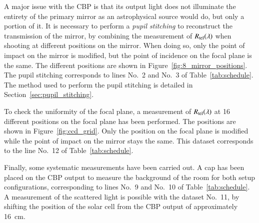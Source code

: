A major issue with the CBP is that its output light does not illuminate the entirety of the \SD primary mirror as an astrophysical source would do, but only a portion of it. It is necessary to perform a \textit{pupil stitching} to reconstruct the transmission of the mirror, by combining the measurement of $R_{\mathrm{tel}}(\lambda)$ when shooting at different positions on the mirror. When doing so, only the point of impact on the mirror is modified, but the point of incidence on the focal plane is the same. The different positions are shown in Figure~\ref{fig:8_mirror_positions}. The pupil stitching corresponds to lines No.~2 and No.~3 of Table~\ref{tab:schedule}. The method used to perform the pupil stitching is detailed in Section~\ref{sec:pupil_stitching}.

To check the uniformity of the \SD focal plane, a measurement of $R_{\mathrm{tel}}(\lambda)$ at 16 different positions on the focal plane has been performed. The positions are shown in Figure~\ref{fig:ccd_grid}. Only the position on the focal plane is modified while the point of impact on the mirror stays the same. This dataset corresponds to the line No.~12 of Table~\ref{tab:schedule}. 

Finally, some systematic measurements have been carried out. A cap has been placed on the CBP output to measure the background of the room for both setup configurations, corresponding to lines No.~9 and No.~10 of Table~\ref{tab:schedule}. A measurement of the scattered light is possible with the dataset No.~11, by shifting the position of the solar cell from the CBP output of approximately \SI{16}{\centi\meter}.


